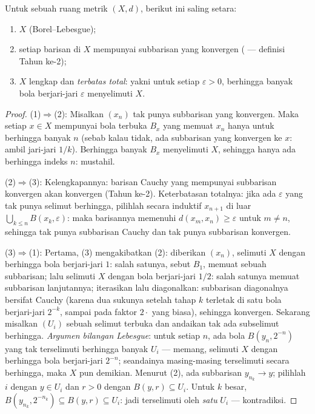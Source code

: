 \begin{theorem}
\label{thm:b3:topology:metriccompact}
Untuk sebuah ruang metrik $(X, d)$, berikut ini saling
setara:
\begin{enumerate}
  \item $X$  (Borel--Lebesgue);
  \item setiap barisan di $X$ mempunyai subbarisan yang konvergen
        ( --- definisi Tahun ke-2);
  \item $X$ lengkap dan \emph{terbatas total}: yakni untuk setiap
        $\varepsilon > 0$, berhingga banyak bola berjari-jari
        $\varepsilon$ menyelimuti $X$.
\end{enumerate}
\end{theorem}

\begin{proof}
(1)$\Rightarrow$(2): Misalkan $(x_n)$ tak punya subbarisan yang
konvergen. Maka setiap $x \in X$ mempunyai bola terbuka $B_x$ yang
memuat $x_n$ hanya untuk berhingga banyak $n$ (sebab kalau tidak, ada
subbarisan yang konvergen ke $x$: ambil jari-jari $1/k$). Berhingga banyak
$B_x$ menyelimuti $X$, sehingga hanya ada berhingga indeks $n$:
mustahil.

(2)$\Rightarrow$(3): Kelengkapannya: barisan Cauchy yang mempunyai
subbarisan konvergen akan konvergen (Tahun ke-2). Keterbatasan totalnya: jika
ada $\varepsilon$ yang tak punya selimut berhingga, pilihlah secara induktif
$x_{n+1}$ di luar $\bigcup_{k\leq n} B(x_k, \varepsilon)$: maka
barisannya memenuhi $d(x_m, x_n) \geq \varepsilon$ untuk $m \neq n$, sehingga tak punya
subbarisan Cauchy dan tak punya subbarisan konvergen.

(3)$\Rightarrow$(1): Pertama, (3) mengakibatkan (2): diberikan $(x_n)$,
selimuti $X$ dengan berhingga bola berjari-jari $1$: salah satunya, sebut $B_1$,
memuat sebuah subbarisan; lalu selimuti $X$ dengan bola berjari-jari $1/2$: salah satunya
memuat subbarisan lanjutannya; iterasikan lalu diagonalkan: subbarisan
diagonalnya bersifat Cauchy (karena dua sukunya setelah tahap $k$ terletak
di satu bola berjari-jari $2^{-k}$, sampai pada faktor $2\cdot$ yang biasa),
sehingga konvergen. Sekarang misalkan $(U_i)$ sebuah selimut terbuka dan andaikan tak ada
subselimut berhingga. \emph{Argumen bilangan Lebesgue}: untuk setiap $n$,
ada bola $B(y_n, 2^{-n})$ yang tak terselimuti berhingga banyak
$U_i$ --- memang, selimuti $X$ dengan berhingga bola berjari-jari
$2^{-n}$; seandainya masing-masing terselimuti secara berhingga, maka $X$ pun demikian. Menurut
(2), ada subbarisan $y_{n_k} \to y$; pilihlah $i$ dengan $y \in U_i$
dan $r > 0$ dengan $B(y, r) \subseteq U_i$. Untuk $k$ besar,
$B(y_{n_k}, 2^{-n_k}) \subseteq B(y, r) \subseteq U_i$: jadi terselimuti
oleh \emph{satu} $U_i$ --- kontradiksi.
\end{proof}

